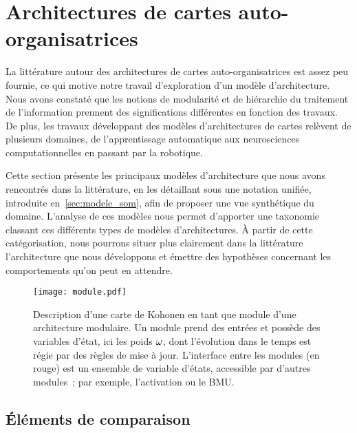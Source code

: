 \documentclass[../main]{subfiles}
\begin{document}
\section{Architectures de cartes auto-organisatrices}

La littérature autour des architectures de cartes auto-organisatrices est assez peu fournie, ce qui motive notre travail d'exploration d'un modèle d'architecture. 
Nous avons constaté que les notions de modularité et de hiérarchie du traitement de l'information prennent des significations différentes en fonction des travaux. De plus, les travaux développant des modèles d'architectures de cartes relèvent de plusieurs domaines, de l'apprentissage automatique aux neurosciences computationnelles en passant par la robotique.

Cette section présente les principaux modèles d'architecture que nous avons rencontrés dans la littérature, en les détaillant sous une notation unifiée, introduite en~\ref{sec:modele_som}, afin de proposer une vue synthétique du domaine. L'analyse de ces modèles nous permet d'apporter une taxonomie classant ces différents types de modèles d'architectures. \`A partir de cette catégorisation, nous pourrons situer plus clairement dans la littérature l'architecture que nous développons et émettre des hypothèses concernant les comportements qu'on peut en attendre.

\begin{figure}
    \centering
    \texttt{[image: module.pdf]}
    \caption{Description d'une carte de Kohonen en tant que module d'une architecture modulaire. Un module prend des entrées et possède des variables d'état, ici les poids $\omega$, dont l'évolution dans le temps est régie par des règles de mise à jour. L'interface entre les modules (en rouge) est un ensemble de variable d'états, accessible par d'autres modules~; par exemple, l'activation ou le BMU. \label{fig:module}}
\end{figure}

\subsection{\'Eléments de comparaison}
\end{document}
